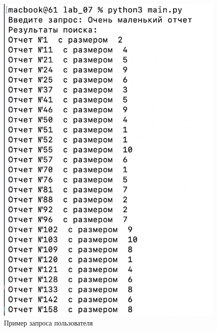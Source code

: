     \begin{figure}[!h]
            \centering
            \includegraphics[scale=0.6]{img/1.png}
            \caption{Пример запроса пользователя}
            \label{graph:test:2}
        \end{figure}
